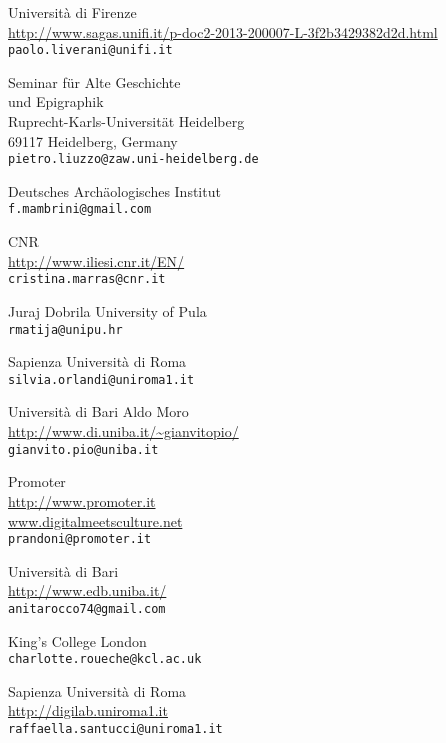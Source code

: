 \begin{contributors}
{  Università di Firenze \\
\url{http://www.sagas.unifi.it/p-doc2-2013-200007-L-3f2b3429382d2d.html} \\
\texttt{paolo.liverani@unifi.it}
}

{Seminar für Alte Geschichte\\ und Epigraphik\\
Ruprecht-Karls-Universität Heidelberg\\
69117 Heidelberg, Germany\\
\texttt{pietro.liuzzo@zaw.uni-heidelberg.de}}


{Deutsches Archäologisches Institut \\
\texttt{f.mambrini@gmail.com}
}


{CNR  \\
\url{ http://www.iliesi.cnr.it/EN/}	\\
\texttt{cristina.marras@cnr.it		}
}
	

{  Juraj Dobrila University of Pula	 \\
\texttt{rmatija@unipu.hr}
}

{  Sapienza Università di Roma	 \\
\texttt{silvia.orlandi@uniroma1.it}
}
	
			

{ Università di Bari Aldo Moro	  \\
\url{http://www.di.uniba.it/~gianvitopio/ }\\
\texttt{gianvito.pio@uniba.it}
}

{ Promoter	  \\
\url{http://www.promoter.it} \\
\url{ www.digitalmeetsculture.net}	\\
\texttt{prandoni@promoter.it}
}



{  Università di Bari	 \\
\url{http://www.edb.uniba.it/} \\
\texttt{anitarocco74@gmail.com}
}
			

{ King's College London	  \\
\texttt{charlotte.roueche@kcl.ac.uk	}
}
	

{ Sapienza Università di Roma  \\
\url{http://digilab.uniroma1.it }\\
\texttt{raffaella.santucci@uniroma1.it	}
}



\end{contributors}
